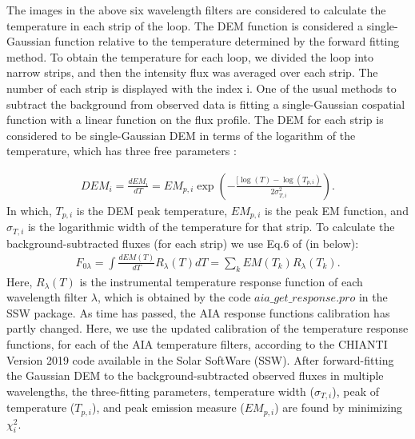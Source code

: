 \documentclass[oneside,onecolumn]{article}
\begin{document}
The images in the above six wavelength filters are considered to calculate the temperature in each strip of the loop. The DEM function is considered a single-Gaussian function relative to the temperature determined by the forward fitting method. To obtain the temperature for each loop, we divided the loop into narrow strips, and then the intensity flux was averaged over each strip. The number of each strip is displayed with the index i. One of the usual methods to subtract the background from observed data is fitting a single-Gaussian cospatial function with a linear function on the flux profile. The DEM for each strip is considered to be single-Gaussian DEM in terms of the logarithm of the temperature, which has three free parameters \citep{ref:Aschwanden2011}:

\begin{eqnarray}
DEM_{i}=\frac{dEM_{i}}{dT}=EM_{p,i}\exp{(-\frac{[\log{(T)}-\log{(T_{p,i})}}{2\sigma^{2}_{T,i}})}.
\end{eqnarray}	
In which, $T_{p,i}$ is the DEM peak temperature, $EM_{p,i}$ is the peak EM function, and $\sigma_{T,i}$ 
is the logarithmic width of the temperature for that strip. To calculate the background-subtracted fluxes (for each strip) we use Eq.6 of \citet{ref:Aschwanden2011} (in below):
\begin{eqnarray}
F_{0\lambda}=\int{\frac{dEM(T)}{dT}R_{\lambda}(T)dT}=\sum_{k}EM(T_{k})R_{\lambda}(T_{k}).
\end{eqnarray}	
Here, $R_{\lambda}(T)$ is the instrumental temperature response function of each wavelength filter $\lambda$, which is obtained by the code $aia{\_}get{\_}response.pro$ in the SSW package. As time has passed, the AIA response functions calibration has partly changed. Here, we use the updated calibration of the temperature response functions, for each of the AIA temperature filters, according to the CHIANTI Version 2019 code available in the Solar SoftWare (SSW). After forward-fitting the Gaussian DEM to the background-subtracted observed fluxes in multiple wavelengths, the three-fitting parameters, temperature width ($\sigma_{T,i}$), peak of temperature ($T_{p,i}$), and peak emission measure ($EM_{p,i}$) are found by minimizing $\chi^2_{i}$. 
\end{document}

